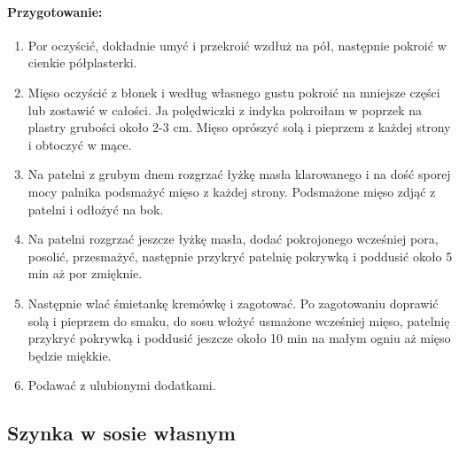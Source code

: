\documentclass{article}
\begin{document}
    \paragraph{Przygotowanie:}
    \begin{enumerate}
        \item Por oczyścić, dokładnie umyć i przekroić wzdłuż na pół, następnie
            pokroić w cienkie półplasterki.
        \item Mięso oczyścić z błonek i według własnego gustu pokroić na
            mniejsze części lub zostawić w całości. Ja polędwiczki z indyka
            pokroiłam w poprzek na plastry grubości około 2-3 cm. Mięso oprószyć
            solą i pieprzem z każdej strony i obtoczyć w mące.
        \item Na patelni z grubym dnem rozgrzać łyżkę masła klarowanego i na
            dość sporej mocy palnika podsmażyć mięso z każdej strony.
            Podsmażone mięso zdjąć z patelni i odłożyć na bok.
        \item Na patelni rozgrzać jeszcze łyżkę masła, dodać pokrojonego
            wcześniej pora, posolić, przesmażyć, następnie przykryć patelnię
            pokrywką i poddusić około 5 min aż por zmięknie.
        \item Następnie wlać śmietankę kremówkę i zagotować. Po zagotowaniu
            doprawić solą i pieprzem do smaku, do sosu włożyć usmażone wcześniej
            mięso, patelnię przykryć pokrywką i poddusić jeszcze około 10 min na
            małym ogniu aż mięso będzie miękkie.
        \item Podawać z ulubionymi dodatkami.
    \end{enumerate}
    \newpage


    \subsection{Szynka w sosie własnym}
    \bigskip
\end{document}
